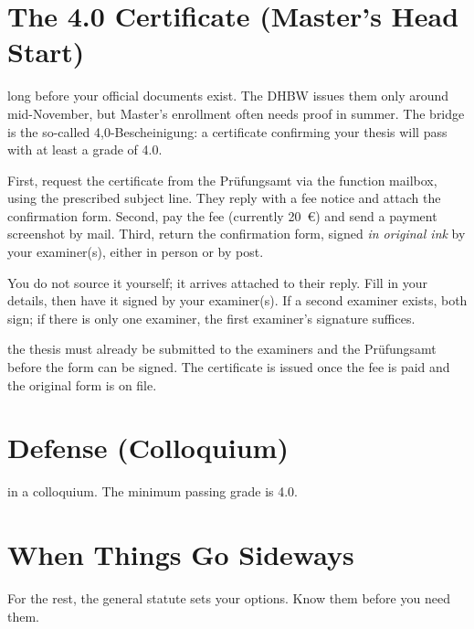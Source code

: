 \documentclass{../sharedAssets/tufte}
\begin{document}
\section{The 4.0 Certificate (Master's Head Start)}
 long before your official documents exist. The DHBW issues them only around mid-November, but Master's enrollment often needs proof in summer. The bridge is the so-called 4,0-Bescheinigung: a certificate confirming your thesis will pass with at least a grade of 4.0.

 First, request the certificate from the Prüfungsamt via the function mailbox, using the prescribed subject line. They reply with a fee notice and attach the confirmation form. Second, pay the fee (currently 20~€) and send a payment screenshot by mail. Third, return the confirmation form, signed \emph{in original ink} by your examiner(s), either in person or by post.

 You do not source it yourself; it arrives attached to their reply. Fill in your details, then have it signed by your examiner(s). If a second examiner exists, both sign; if there is only one examiner, the first examiner's signature suffices.

 the thesis must already be submitted to the examiners and the Prüfungsamt before the form can be signed. The certificate is issued once the fee is paid and the original form is on file.


\section{Defense (Colloquium)}
 in a colloquium. The minimum passing grade is 4.0.


\section{When Things Go Sideways}
 For the rest, the general statute sets your options. Know them before you need them.
\end{document}
